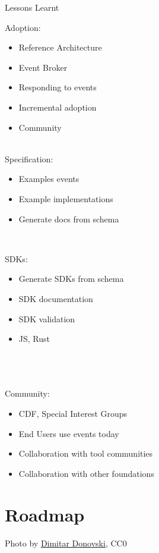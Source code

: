 \documentclass[aspectratio=169,11pt,hyperref={colorlinks=true}]{beamer}
\begin{document}
\begin{3squares}{Lessons Learnt}{%
  Adoption:
  \begin{itemize}
    \item Reference Architecture
    \item Event Broker
    \item Responding to events
    \item Incremental adoption
    \item Community
  \end{itemize}
}{%
  \tiny~\\
  \normalsize
  Specification:
  \begin{itemize}
    \item Examples events
    \item Example implementations
    \item Generate docs from schema
  \end{itemize}
  ~ \\
}{%
  SDKs:
  \begin{itemize}
    \item Generate SDKs from schema
    \item SDK documentation
    \item SDK validation
    \item JS, Rust
  \end{itemize}
  ~ \\
  ~ \\
  \tiny~\\
  \normalsize
  Community:
  \begin{itemize}
    \item CDF, Special Interest Groups
    \item End Users use events today
    \item Collaboration with tool communities
    \item Collaboration with other foundations
  \end{itemize}
}
\end{3squares}

\section{Roadmap}
\begin{sectionwithpiclargecentral}{Photo by \href{https://unsplash.com/@dmtrdon}{\underline{Dimitar Donovski}}, CC0}
\end{sectionwithpiclargecentral}
\end{document}
